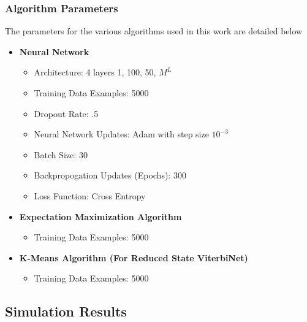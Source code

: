 \documentclass[12pt,a4paper]{report}
\begin{document}
\subsubsection{Algorithm Parameters}
The parameters for the various algorithms used in this work are detailed below
\begin{itemize}
\item \textbf{Neural Network}
\begin{itemize}
\item Architecture: 4 layers {1, 100, 50, $M^L$}
\item Training Data Examples: 5000
\item Dropout Rate: .5
\item Neural Network Updates: Adam with step size $10^{-3}$ \cite{kingma2014adam}
\item Batch Size: 30 
\item Backpropogation Updates (Epochs): 300
\item Loss Function: Cross Entropy
\end{itemize}
\item \textbf{Expectation Maximization Algorithm}
\begin{itemize}
\item Training Data Examples: 5000
\end{itemize}
\item \textbf{K-Means Algorithm (For Reduced State ViterbiNet)}
\begin{itemize}
\item Training Data Examples: 5000
\end{itemize}
\end{itemize}


\subsection{Simulation Results}
\end{document}

